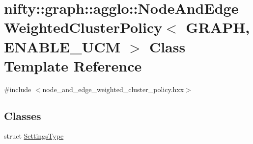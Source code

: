 \hypertarget{classnifty_1_1graph_1_1agglo_1_1NodeAndEdgeWeightedClusterPolicy}{}\section{nifty\+:\+:graph\+:\+:agglo\+:\+:Node\+And\+Edge\+Weighted\+Cluster\+Policy$<$ G\+R\+A\+PH, E\+N\+A\+B\+L\+E\+\_\+\+U\+CM $>$ Class Template Reference}
\label{classnifty_1_1graph_1_1agglo_1_1NodeAndEdgeWeightedClusterPolicy}


{\ttfamily \#include $<$node\+\_\+and\+\_\+edge\+\_\+weighted\+\_\+cluster\+\_\+policy.\+hxx$>$}

\subsection*{Classes}
\begin{DoxyCompactItemize}
\item 
struct \hyperlink{structnifty_1_1graph_1_1agglo_1_1NodeAndEdgeWeightedClusterPolicy_1_1SettingsType}{Settings\+Type}
\end{DoxyCompactItemize}
